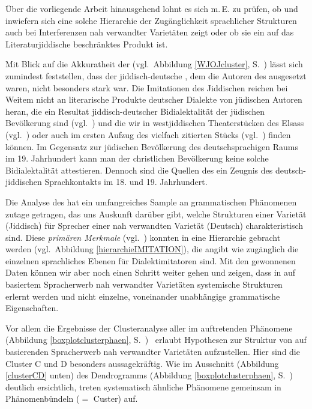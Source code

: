 \noindent  Über die vorliegende Arbeit hinausgehend lohnt es sich m.\,E. zu prüfen, ob und inwiefern sich eine solche Hierarchie der Zugänglichkeit sprachlicher Strukturen \,%
 auch bei Interferenzen nah verwandter Varietäten zeigt oder ob sie ein auf das Literaturjiddische beschränktes Produkt ist.

Mit Blick auf die Akkuratheit der  (vgl.\, Abbildung \ref{WJOJcluster}, S.\, \pageref{WJOJcluster}) lässt sich zumindest feststellen, dass der jiddisch-deutsche , dem die Autoren des  ausgesetzt waren, nicht besonders stark war. Die Imitationen des Jiddischen reichen bei Weitem nicht an literarische Produkte deutscher Dialekte von jüdischen Autoren heran, die ein Resultat jiddisch-deutscher Bidialektalität der jüdischen Bevölkerung sind (vgl.\, \citealt{Schaefer2014}) und die wir in westjiddischen Theaterstücken des Elsass (vgl.\, \citealt{Schaefer2008}) oder auch im ersten Aufzug des vielfach zitierten Stücks  (vgl.\, \citealt{Lowenstein1975}) finden können. Im Gegensatz zur jüdischen Bevölkerung des deutschsprachigen Raums im 19. Jahrhundert kann man der christlichen Bevölkerung keine solche Bidialektalität attestieren. Dennoch sind die Quellen des  ein Zeugnis des deutsch-jiddischen Sprachkontakts im 18. und 19. Jahrhundert.

Die Analyse des \hai{{\LiJi}} hat ein umfangreiches Sample an grammatischen Phänomenen zutage getragen, das uns Auskunft darüber gibt, welche Strukturen einer Varietät (Jiddisch) für Sprecher einer nah verwandten Varietät (Deutsch) charakteristisch sind. Diese \textit{primären Merkmale} (vgl.\, \citealt[118]{Schirmunski1962}) konnten in eine Hierarchie gebracht werden (vgl.\, Abbildung \ref{hierarchieIMITATION}), die angibt wie zugänglich die einzelnen sprachliches Ebenen für Dialektimitatoren sind. Mit den gewonnenen Daten können wir aber noch einen Schritt weiter gehen und zeigen, dass in auf   \,%
 basiertem Spracherwerb nah verwandter Varietäten systemische Strukturen erlernt werden und nicht einzelne, voneinander unabhängige grammatische Eigenschaften.  

\newpage
Vor allem die Ergebnisse der Clusteranalyse aller im  auftretenden Phänomene (Abbildung \ref{boxplotclusterphaen}, S.\, \pageref{boxplotclusterphaen}) \,%
 erlaubt Hypothesen zur Struktur von auf  basierenden Spracherwerb nah verwandter Varietäten aufzustellen. Hier sind die Cluster C und D besonders aussagekräftig.
 Wie im Ausschnitt (Abbildung \ref{clusterCD} unten) des Dendrogramms (Abbildung \ref{boxplotclusterphaen}, S.\, \pageref{boxplotclusterphaen}) deutlich ersichtlich, treten systematisch ähnliche Phänomene gemeinsam in Phänomenbündeln ($=$ Custer) auf. 


